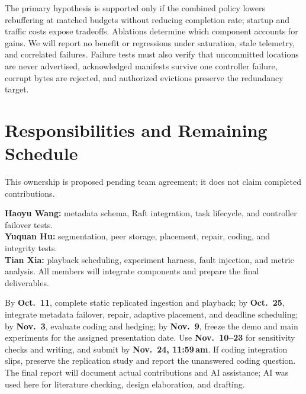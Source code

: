 \documentclass[letterpaper,twocolumn,10pt]{article}
\begin{document}
The primary hypothesis is supported only if the combined policy lowers rebuffering at matched budgets without reducing completion rate; startup and traffic costs expose tradeoffs. Ablations determine which component accounts for gains. We will report no benefit or regressions under saturation, stale telemetry, and correlated failures. Failure tests must also verify that uncommitted locations are never advertised, acknowledged manifests survive one controller failure, corrupt bytes are rejected, and authorized evictions preserve the redundancy target.

\section{Responsibilities and Remaining Schedule}
This ownership is proposed pending team agreement; it does not claim completed contributions.

\noindent\textbf{Haoyu Wang:} metadata schema, Raft integration, task lifecycle, and controller failover tests.\\
\textbf{Yuquan Hu:} segmentation, peer storage, placement, repair, coding, and integrity tests.\\
\textbf{Tian Xia:} playback scheduling, experiment harness, fault injection, and metric analysis. All members will integrate components and prepare the final deliverables.

By \textbf{Oct.~11}, complete static replicated ingestion and playback; by \textbf{Oct.~25}, integrate metadata failover, repair, adaptive placement, and deadline scheduling; by \textbf{Nov.~3}, evaluate coding and hedging; by \textbf{Nov.~9}, freeze the demo and main experiments for the assigned presentation date. Use \textbf{Nov.~10--23} for sensitivity checks and writing, and submit by \textbf{Nov.~24, 11:59\,am}. If coding integration slips, preserve the replication study and report the unanswered coding question. The final report will document actual contributions and AI assistance; AI was used here for literature checking, design elaboration, and drafting.



\end{document}
